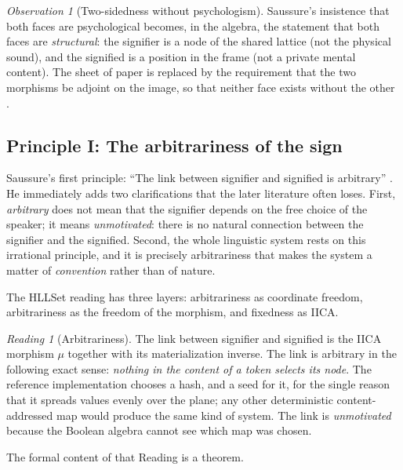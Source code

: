 \documentclass[11pt,a4paper]{article}
\theoremstyle{remark}
\newtheorem{observation}[principle]{Observation}
\newtheorem{reading}[principle]{Reading}
\newcommand{\Ing}{\ensuremath{\mu}}                      %
\begin{document}
\begin{observation}[Two-sidedness without psychologism]
Saussure's insistence that both faces are psychological becomes, in the
algebra, the statement that both faces are \emph{structural}: the signifier is
a node of the shared lattice (not the physical sound), and the signified is a
position in the frame (not a private mental content). The sheet of paper is
replaced by the requirement that the two morphisms be adjoint on the image, so
that neither face exists without the other \cite{langue2026}.
\end{observation}

\subsection{Principle I: The arbitrariness of the sign}
\label{sec:arbitrariness}

Saussure's first principle: ``The link between signifier and signified is
arbitrary'' \cite[Part I, ch.~I, \S2]{harris1983}. He immediately adds two
clarifications that the later literature often loses. First, \emph{arbitrary}
does not mean that the signifier depends on the free choice of the speaker; it
means \emph{unmotivated}: there is no natural connection between the signifier
and the signified. Second, the whole linguistic system rests on this irrational
principle, and it is precisely arbitrariness that makes the system a matter of
\emph{convention} rather than of nature.

The HLLSet reading has three layers: arbitrariness as coordinate freedom,
arbitrariness as the freedom of the morphism, and fixedness as IICA.

\begin{reading}[Arbitrariness]
\label{read:arbitrariness}
The link between signifier and signified is the IICA morphism $\Ing$ together
with its materialization inverse. The link is arbitrary in the following exact
sense: \emph{nothing in the content of a token selects its node}. The
reference implementation chooses a hash, and a seed for it, for the single
reason that it spreads values evenly over the plane; any other deterministic
content-addressed map would produce the same kind of system. The link is
\emph{unmotivated} because the Boolean algebra cannot see which map was chosen.
\end{reading}

The formal content of that Reading is a theorem.
\end{document}

